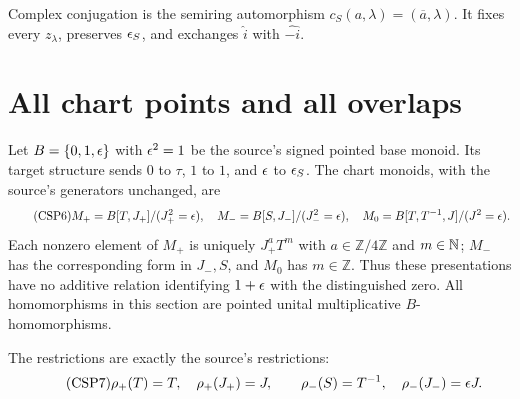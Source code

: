 Complex conjugation is the semiring automorphism
$c_S(a,\lambda)=(\overline a,\lambda)$.  It fixes every $z_\lambda$,
preserves $\epsilon_S$, and exchanges $\widehat i$ with $\widehat{-i}$.

\section{All chart points and all overlaps}

Let $B=\{0,1,\epsilon\}$ with $\epsilon^2=1$ be the source's signed pointed
base monoid.  Its target structure sends $0$ to $\tau$, $1$ to $1$,
and $\epsilon$ to $\epsilon_S$.  The chart monoids, with the source's
generators unchanged, are
\begin{equation}\tag{CSP6}
 M_+=B[T,J_+]/(J_+^2=\epsilon),\quad
 M_-=B[S,J_-]/(J_-^2=\epsilon),\quad
 M_0=B[T,T^{-1},J]/(J^2=\epsilon).
\end{equation}
Each nonzero element of $M_+$ is uniquely $J_+^aT^m$ with
$a\in\mathbb Z/4\mathbb Z$ and $m\in\mathbb N$; $M_-$ has the
corresponding form in $J_-,S$, and $M_0$ has $m\in\mathbb Z$.
Thus these presentations have no additive relation identifying
$1+\epsilon$ with the distinguished zero.  All homomorphisms in this
section are pointed unital multiplicative $B$-homomorphisms.

The restrictions are exactly the source's restrictions:
\begin{equation}\tag{CSP7}
 \rho_+(T)=T,\quad\rho_+(J_+)=J,\qquad
 \rho_-(S)=T^{-1},\quad\rho_-(J_-)=\epsilon J.
\end{equation}

